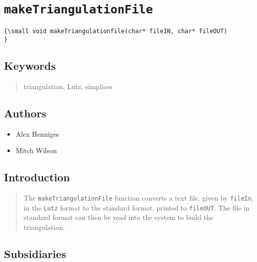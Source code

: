                       


\section*{\texttt{makeTriangulationFile}}

\label{f0}{\small }
\begin{verbatim}
{\small void makeTriangulationfile(char* fileIN, char* fileOUT)
}
\end{verbatim}

\subsection*{Keywords}

\begin{quotation}
triangulation, Lutz, simplices
\end{quotation}

\subsection*{Authors}

\begin{itemize}
\item Alex Henniges

\item Mitch Wilson
\end{itemize}

\subsection*{Introduction}

\begin{quotation}
The \texttt{makeTriangulationFile} function converts a text file, given by 
\texttt{fileIn}, in the \texttt{Lutz} format to the standard format, printed
to \texttt{fileOUT}. The file in standard format can then be read into the
system to build the triangulation.
\end{quotation}

\subsection*{Subsidiaries}

